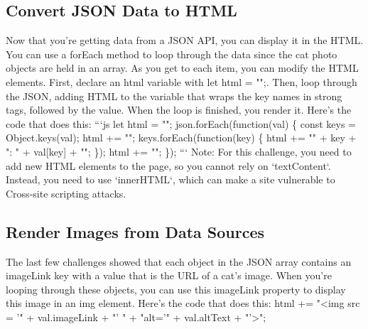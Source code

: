 \documentclass{article}%
\begin{document}
%
\subsection{Convert JSON Data to HTML}%
\label{subsec:ConvertJSONDatatoHTML}%
Now that you're getting data from a JSON API, you can display it in the HTML.\newline%
You can use a forEach method to loop through the data since the cat photo objects are held in an array. As you get to each item, you can modify the HTML elements.\newline%
First, declare an html variable with let html = "";.\newline%
Then, loop through the JSON, adding HTML to the variable that wraps the key names in strong tags, followed by the value. When the loop is finished, you render it.\newline%
Here's the code that does this:\newline%
```js\newline%
let html = "";\newline%
json.forEach(function(val) \{\newline%
  const keys = Object.keys(val);\newline%
  html += "";\newline%
  keys.forEach(function(key) \{\newline%
    html += "" + key + ": " + val{[}key{]} + "";\newline%
  \});\newline%
  html += "";\newline%
\});\newline%
```\newline%
Note: For this challenge, you need to add new HTML elements to the page, so you cannot rely on `textContent`. Instead, you need to use `innerHTML`, which can make a site vulnerable to Cross{-}site scripting attacks.\newline%

%
\subsection{Render Images from Data Sources}%
\label{subsec:RenderImagesfromDataSources}%
The last few challenges showed that each object in the JSON array contains an imageLink key with a value that is the URL of a cat's image.\newline%
When you're looping through these objects, you can use this imageLink property to display this image in an img element.\newline%
Here's the code that does this:\newline%
html += "<img src = '" + val.imageLink + "' " + "alt='" + val.altText + "'>";\newline%
\end{document}

